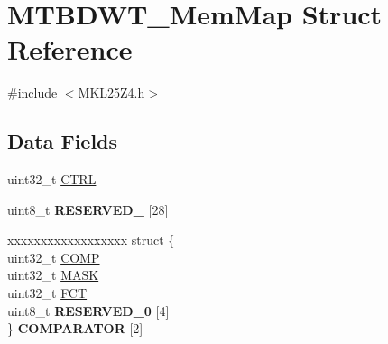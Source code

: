 \hypertarget{struct_m_t_b_d_w_t___mem_map}{}\section{M\+T\+B\+D\+W\+T\+\_\+\+Mem\+Map Struct Reference}
\label{struct_m_t_b_d_w_t___mem_map}


{\ttfamily \#include $<$M\+K\+L25\+Z4.\+h$>$}

\subsection*{Data Fields}
\begin{DoxyCompactItemize}
\item 
uint32\+\_\+t \hyperlink{struct_m_t_b_d_w_t___mem_map_aba0d8163fee473f1b1a2a8528f49639c}{C\+T\+RL}
\item 
\mbox{\label{struct_m_t_b_d_w_t___mem_map_a4e0b43e26991088f981cfcc4d3548c01}} 
uint8\+\_\+t {\bfseries R\+E\+S\+E\+R\+V\+E\+D\+\_} \mbox{[}28\mbox{]}
\item 
\mbox{\label{struct_m_t_b_d_w_t___mem_map_aad4b02afcf439960acb58504bce08479}} 
\begin{tabbing}
xx\=xx\=xx\=xx\=xx\=xx\=xx\=xx\=xx\=\kill
struct \{\\
\>uint32\_t \hyperlink{struct_m_t_b_d_w_t___mem_map_a2dc253306d19e9f365e7ac79eecb8f07}{COMP}\\
\>uint32\_t \hyperlink{struct_m_t_b_d_w_t___mem_map_aaef890e895e809c3197697b5f53eaf43}{MASK}\\
\>uint32\_t \hyperlink{struct_m_t_b_d_w_t___mem_map_a245357bec738a4b4efe972976710ee58}{FCT}\\
\>uint8\_t {\bfseries RESERVED\_0} \mbox{[}4\mbox{]}\\
\} {\bfseries COMPARATOR} \mbox{[}2\mbox{]}\\


\end{tabbing}
\end{DoxyCompactItemize}

